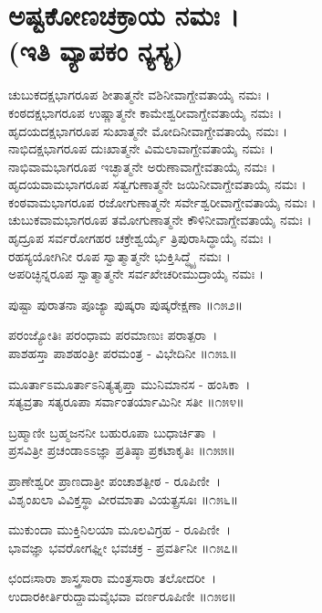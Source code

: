 \section{ಅಷ್ಟಕೋಣಚಕ್ರಾಯ ನಮಃ ।\\ (ಇತಿ ವ್ಯಾಪಕಂ ನ್ಯಸ್ಯ)}
ಚುಬುಕದಕ್ಷಭಾಗರೂಪ ಶೀತಾತ್ಮನೇ ವಶಿನೀವಾಗ್ದೇವತಾಯೈ ನಮಃ ।\\
ಕಂಠದಕ್ಷಭಾಗರೂಪ ಉಷ್ಣಾತ್ಮನೇ ಕಾಮೇಶ್ವರೀವಾಗ್ದೇವತಾಯೈ ನಮಃ ।\\
ಹೃದಯದಕ್ಷಭಾಗರೂಪ ಸುಖಾತ್ಮನೇ ಮೋದಿನೀವಾಗ್ದೇವತಾಯೈ ನಮಃ ।\\
ನಾಭಿದಕ್ಷಭಾಗರೂಪ ದುಃಖಾತ್ಮನೇ ವಿಮಲಾವಾಗ್ದೇವತಾಯೈ ನಮಃ ।\\
ನಾಭಿವಾಮಭಾಗರೂಪ ಇಚ್ಛಾತ್ಮನೇ ಅರುಣಾವಾಗ್ದೇವತಾಯೈ ನಮಃ ।\\
ಹೃದಯವಾಮಭಾಗರೂಪ ಸತ್ವಗುಣಾತ್ಮನೇ ಜಯಿನೀವಾಗ್ದೇವತಾಯೈ ನಮಃ ।\\
ಕಂಠವಾಮಭಾಗರೂಪ ರಜೋಗುಣಾತ್ಮನೇ ಸರ್ವೇಶ್ವರೀವಾಗ್ದೇವತಾಯೈ ನಮಃ ।\\
ಚುಬುಕವಾಮಭಾಗರೂಪ ತಮೋಗುಣಾತ್ಮನೇ ಕೌಳಿನೀವಾಗ್ದೇವತಾಯೈ ನಮಃ ।\\
ಹೃದ್ರೂಪ ಸರ್ವರೋಗಹರ ಚಕ್ರೇಶ್ವರ್ಯೈ ತ್ರಿಪುರಾಸಿದ್ಧಾಯೈ ನಮಃ ।\\
ರಹಸ್ಯಯೋಗಿನೀ ರೂಪ ಸ್ವಾತ್ಮಾತ್ಮನೇ ಭುಕ್ತಿಸಿದ್ಧ್ಯೈ ನಮಃ ।\\
ಅಪರಿಚ್ಛಿನ್ನರೂಪ ಸ್ವಾತ್ಮಾತ್ಮನೇ ಸರ್ವಖೇಚರೀಮುದ್ರಾಯೈ ನಮಃ ।

ಪುಷ್ಟಾ ಪುರಾತನಾ ಪೂಜ್ಯಾ ಪುಷ್ಕರಾ ಪುಷ್ಕರೇಕ್ಷಣಾ ॥೧೫೨॥

ಪರಂಜ್ಯೋತಿಃ ಪರಂಧಾಮ ಪರಮಾಣುಃ ಪರಾತ್ಪರಾ~।\\
ಪಾಶಹಸ್ತಾ ಪಾಶಹಂತ್ರೀ ಪರಮಂತ್ರ - ವಿಭೇದಿನೀ ॥೧೫೩॥

ಮೂರ್ತಾಽಮೂರ್ತಾಽನಿತ್ಯತೃಪ್ತಾ ಮುನಿಮಾನಸ - ಹಂಸಿಕಾ~।\\
ಸತ್ಯವ್ರತಾ ಸತ್ಯರೂಪಾ ಸರ್ವಾಂತರ್ಯಾಮಿನೀ ಸತೀ ॥೧೫೪॥

ಬ್ರಹ್ಮಾಣೀ ಬ್ರಹ್ಮಜನನೀ ಬಹುರೂಪಾ ಬುಧಾರ್ಚಿತಾ~।\\
ಪ್ರಸವಿತ್ರೀ ಪ್ರಚಂಡಾಽಽಜ್ಞಾ ಪ್ರತಿಷ್ಠಾ ಪ್ರಕಟಾಕೃತಿಃ ॥೧೫೫॥

ಪ್ರಾಣೇಶ್ವರೀ ಪ್ರಾಣದಾತ್ರೀ ಪಂಚಾಶತ್ಪೀಠ - ರೂಪಿಣೀ~।\\
ವಿಶೃಂಖಲಾ ವಿವಿಕ್ತಸ್ಥಾ ವೀರಮಾತಾ ವಿಯತ್ಪ್ರಸೂಃ ॥೧೫೬॥

ಮುಕುಂದಾ ಮುಕ್ತಿನಿಲಯಾ ಮೂಲವಿಗ್ರಹ - ರೂಪಿಣೀ~।\\
ಭಾವಜ್ಞಾ ಭವರೋಗಘ್ನೀ ಭವಚಕ್ರ - ಪ್ರವರ್ತಿನೀ ॥೧೫೭॥

ಛಂದಃಸಾರಾ ಶಾಸ್ತ್ರಸಾರಾ ಮಂತ್ರಸಾರಾ ತಲೋದರೀ~।\\
ಉದಾರಕೀರ್ತಿರುದ್ದಾಮವೈಭವಾ ವರ್ಣರೂಪಿಣೀ ॥೧೫೮॥


